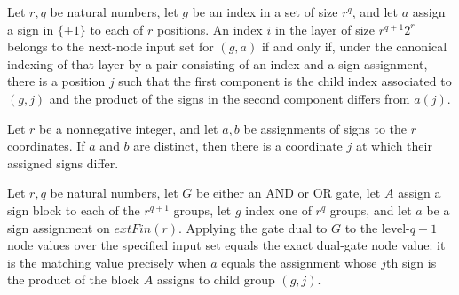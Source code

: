 \begin{theorem}
\label{FABL.mem_parityNextNodeInputs_iff}
\leanok
{}
Let $r,q$ be natural numbers, let $g$ be an index in a set of size $r^q$, and let $a$
assign a sign in $\{\pm1\}$ to each of $r$ positions. An index $i$ in the layer of size
$r^{q+1}2^r$ belongs to the next-node input set for $(g,a)$ if and only if, under the
canonical indexing of that layer by a pair consisting of an index and a sign assignment,
there is a position $j$ such that the first component is the child index associated to
$(g,j)$ and the product of the signs in the second component differs from $a(j)$.
\end{theorem}

\begin{theorem}
\label{FABL.exists_apply_ne_of_ne}
\leanok
{}
Let $r$ be a nonnegative integer, and let $a,b$ be assignments of signs to the $r$
coordinates. If $a$ and $b$ are distinct, then there is a coordinate $j$ at which their
assigned signs differ.
\end{theorem}

\begin{theorem}
\label{FABL.eval_parityNextNodeInputs}
\leanok
{}
Let $r,q$ be natural numbers, let $G$ be either an AND or OR gate, let $A$ assign a sign
block to each of the $r^{q+1}$ groups, let $g$ index one of $r^q$ groups, and let $a$ be
a sign assignment on $	ext{Fin}(r)$. Applying the gate dual to $G$ to the level-$q+1$
node values over the specified input set equals the exact dual-gate node value: it is
the matching value precisely when $a$ equals the assignment whose $j$th sign is the
product of the block $A$ assigns to child group $(g,j)$.
\end{theorem}

